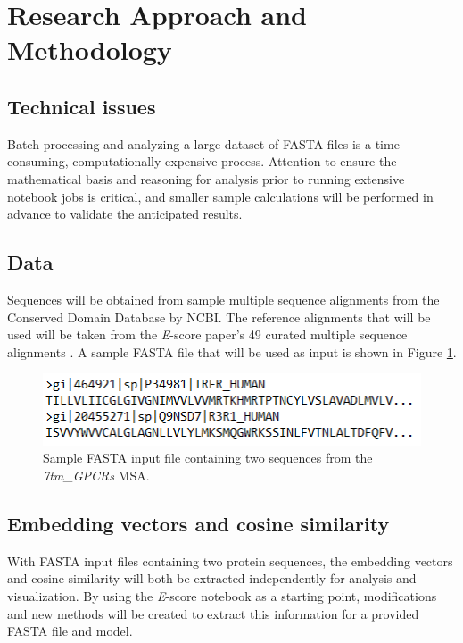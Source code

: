 \documentclass[
	letterpaper, %
	10pt, %
]{journalArticle}
\begin{document}
\section{Research Approach and Methodology}

\subsection{Technical issues}
Batch processing and analyzing a large dataset of FASTA files is a time-consuming, computationally-expensive process. Attention to ensure the mathematical basis and reasoning for analysis prior to running extensive notebook jobs is critical, and smaller sample calculations will be performed in advance to validate the anticipated results.

\subsection{Data}
Sequences will be obtained from sample multiple sequence alignments from the Conserved Domain Database \autocite{Marchler-Bauer:2015} by NCBI. The reference alignments that will be used will be taken from the \textit{E}-score paper's 49 curated multiple sequence alignments \autocite{Ashrafzadeh:2023}. A sample FASTA file that will be used as input is shown in Figure \ref{fig:sequence}.

\begin{figure} %
	\includegraphics[width=\linewidth]{Figures/sequences.png}
	\caption{Sample FASTA input file containing two sequences from the \textit{7tm\_GPCRs} MSA.}
	\label{fig:sequence}
\end{figure}

\subsection{Embedding vectors and cosine similarity}
With FASTA input files containing two protein sequences, the embedding vectors and cosine similarity will both be extracted independently for analysis and visualization. By using the \textit{E}-score notebook as a starting point, modifications and new methods will be created to extract this information for a provided FASTA file and model.
\end{document}
